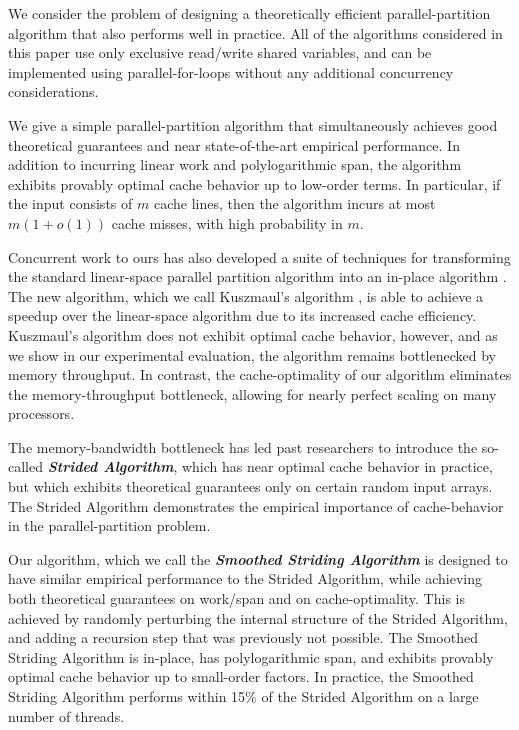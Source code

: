 \documentclass[11pt]{article}
\newcommand{\defn}[1]{{\textit{\textbf{\boldmath #1}}}}
\renewcommand{\paragraph}[1]{\vspace{0.09in}\noindent{\bf \boldmath #1.}}
\theoremstyle{remark}
\theoremstyle{remark}
\begin{document}
\paragraph{Results}
We consider the problem of designing a theoretically efficient
parallel-partition algorithm that also performs well in practice. All
of the algorithms considered in this paper use only exclusive
read/write shared variables, and can be implemented using
parallel-for-loops without any additional concurrency considerations.

We give a simple parallel-partition algorithm that simultaneously
achieves good theoretical guarantees and near state-of-the-art
empirical performance. In addition to incurring linear work and
polylogarithmic span, the algorithm exhibits provably optimal cache
behavior up to low-order terms. In particular, if the input consists
of $m$ cache lines, then the algorithm incurs at most $m(1 + o(1))$ cache misses,
with high probability in $m$.

Concurrent work to ours has also developed a suite of techniques for
transforming the standard linear-space parallel partition algorithm
into an in-place algorithm \cite{Kuszmaul19}. The new algorithm, which
we call Kuszmaul's algorithm \cite{Kuszmaul19}, is able to achieve a
speedup over the linear-space algorithm due to its increased cache
efficiency. Kuszmaul's algorithm does not exhibit optimal cache
behavior, however, and as we show in our experimental evaluation, the
algorithm remains bottlenecked by memory throughput. In contrast, the
cache-optimality of our algorithm eliminates the memory-throughput
bottleneck, allowing for nearly perfect scaling on many processors.

The memory-bandwidth bottleneck has led past researchers
\cite{FrancisPa92, Frias08} to introduce the so-called \defn{Strided
  Algorithm}, which has near optimal cache behavior in practice, but
which exhibits theoretical guarantees only on certain random input
arrays. The Strided Algorithm demonstrates the empirical importance of
cache-behavior in the parallel-partition problem.

Our algorithm, which we call the \defn{Smoothed Striding Algorithm} is
designed to have similar empirical performance to the Strided
Algorithm, while achieving both theoretical guarantees on work/span
and on cache-optimality. This is achieved by randomly perturbing the
internal structure of the Strided Algorithm, and adding a recursion
step that was previously not possible. The Smoothed Striding Algorithm
is in-place, has polylogarithmic span, and exhibits provably optimal
cache behavior up to small-order factors. In practice, the Smoothed
Striding Algorithm performs within 15\% of the Strided Algorithm on a
large number of threads.
\end{document}

